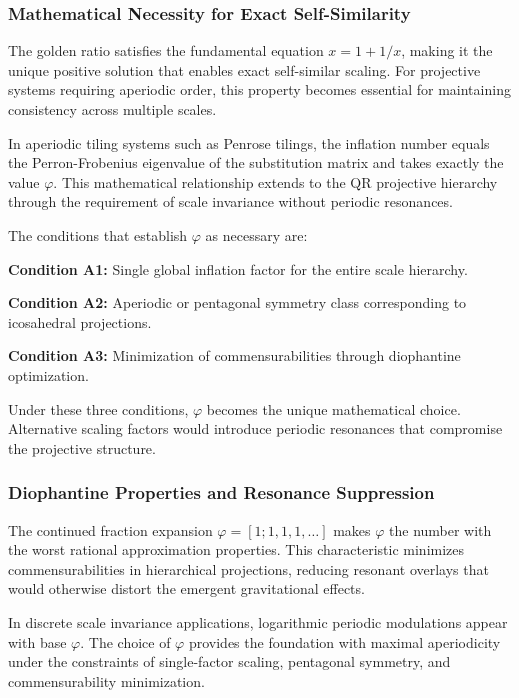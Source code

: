 \subsubsection{Mathematical Necessity for Exact Self-Similarity}
\label{subsubsec:mathematical-necessity}

The golden ratio satisfies the fundamental equation $x = 1 + 1/x$, making it the unique positive solution that enables exact self-similar scaling. For projective systems requiring aperiodic order, this property becomes essential for maintaining consistency across multiple scales.

In aperiodic tiling systems such as Penrose tilings, the inflation number equals the Perron-Frobenius eigenvalue of the substitution matrix and takes exactly the value $\varphi$. This mathematical relationship extends to the QR projective hierarchy through the requirement of scale invariance without periodic resonances.

The conditions that establish $\varphi$ as necessary are:

\textbf{Condition A1:} Single global inflation factor for the entire scale hierarchy.

\textbf{Condition A2:} Aperiodic or pentagonal symmetry class corresponding to icosahedral projections.

\textbf{Condition A3:} Minimization of commensurabilities through diophantine optimization.

Under these three conditions, $\varphi$ becomes the unique mathematical choice. Alternative scaling factors would introduce periodic resonances that compromise the projective structure.

\subsubsection{Diophantine Properties and Resonance Suppression}
\label{subsubsec:diophantine-properties}

The continued fraction expansion $\varphi = [1; 1, 1, 1, \ldots]$ makes $\varphi$ the number with the worst rational approximation properties. This characteristic minimizes commensurabilities in hierarchical projections, reducing resonant overlays that would otherwise distort the emergent gravitational effects.

In discrete scale invariance applications, logarithmic periodic modulations appear with base $\varphi$. The choice of $\varphi$ provides the foundation with maximal aperiodicity under the constraints of single-factor scaling, pentagonal symmetry, and commensurability minimization.

